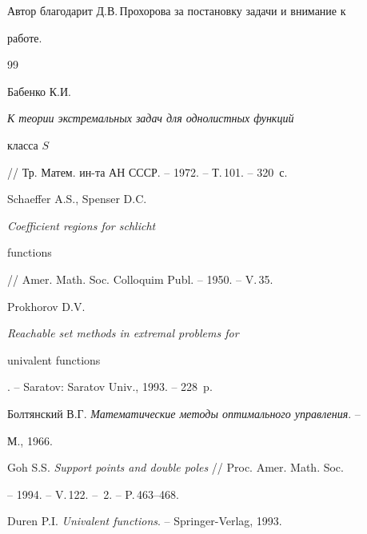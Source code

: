 Автор благодарит Д.В.\,Прохорова за постановку задачи и внимание к


работе.





\begin{thebibliography}{99}







Бабенко К.И. {\em К теории экстремальных задач для однолистных функций


класса $S$} // Тр. Матем. ин-та АН СССР. -- 1972. -- Т.\,101. -- 320~с.




Schaeffer A.S., Spenser D.C. {\em Coefficient regions for schlicht


functions} // Amer. Math. Soc. Colloquim Publ. -- 1950. -- V.\,35.




Prokhorov D.V. {\em Reachable set methods in extremal problems for


univalent functions}. -- Saratov: Saratov Univ., 1993. -- 228~p.




Болтянский В.Г. {\em Математические методы оптимального управления}. --


М., 1966.




Goh S.S. {\em Support points and double poles} // Proc. Amer. Math. Soc.


-- 1994. -- V.\,122. -- \No\,2. -- P.\,463--468.




Duren P.I. {\em Univalent functions}. -- Springer-Verlag, 1993.





\end{thebibliography}





\vskip 2cm












\label{end}





